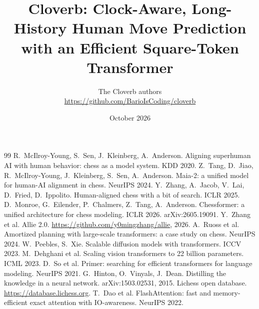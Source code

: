 \documentclass[10pt]{article}
\title{\textbf{Cloverb}: Clock-Aware, Long-History Human Move Prediction\\with an Efficient Square-Token Transformer}
\author{The Cloverb authors\\\small\url{https://github.com/BarioIsCoding/cloverb}}
\date{October 2026}
\begin{document}
\maketitle

\begin{abstract}

\end{abstract}



\begin{thebibliography}{99}
 R.~McIlroy-Young, S.~Sen, J.~Kleinberg, A.~Anderson. Aligning superhuman AI with human behavior: chess as a model system. KDD 2020.
 Z.~Tang, D.~Jiao, R.~McIlroy-Young, J.~Kleinberg, S.~Sen, A.~Anderson. Maia-2: a unified model for human-AI alignment in chess. NeurIPS 2024.
 Y.~Zhang, A.~Jacob, V.~Lai, D.~Fried, D.~Ippolito. Human-aligned chess with a bit of search. ICLR 2025.
 D.~Monroe, G.~Eilender, P.~Chalmers, Z.~Tang, A.~Anderson. Chessformer: a unified architecture for chess modeling. ICLR 2026. arXiv:2605.19091.
 Y.~Zhang et al. Allie 2.0. \url{https://github.com/y0mingzhang/allie}, 2026.
 A.~Ruoss et al. Amortized planning with large-scale transformers: a case study on chess. NeurIPS 2024.
 W.~Peebles, S.~Xie. Scalable diffusion models with transformers. ICCV 2023.
 M.~Dehghani et al. Scaling vision transformers to 22 billion parameters. ICML 2023.
 D.~So et al. Primer: searching for efficient transformers for language modeling. NeurIPS 2021.
 G.~Hinton, O.~Vinyals, J.~Dean. Distilling the knowledge in a neural network. arXiv:1503.02531, 2015.
 Lichess open database. \url{https://database.lichess.org}.
 T.~Dao et al. FlashAttention: fast and memory-efficient exact attention with IO-awareness. NeurIPS 2022.
\end{thebibliography}
\end{document}
